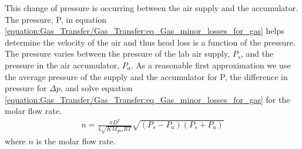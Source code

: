 \documentclass[letterpaper,10pt,english]{sphinxmanual}
\begin{document}
This change of pressure is occurring between the air supply and the accumulator. The pressure, P, in equation \eqref{equation:Gas_Transfer/Gas_Transfer:eq_Gas_minor_losses_for_gas} helps determine the velocity of the air and thus head loss is a function of the pressure. The pressure varies between the pressure of the lab air supply, \(P_s\), and the pressure in the air accumulator, \(P_a\). As a reasonable first approximation we use the average pressure of the supply and the accumulator for P, the difference in pressure for \(\Delta p\), and solve equation \eqref{equation:Gas_Transfer/Gas_Transfer:eq_Gas_minor_losses_for_gas} for the molar flow rate.
\begin{equation}\label{equation:Gas_Transfer/Gas_Transfer:eq_Gas_molar_flow_of_air}
\begin{split}\dot{n}=\frac{\pi D^{2} }{4\sqrt{KM_{gas} RT} } \sqrt{\left(P_{s} -P_{a} \right)\left(P_{s} +P_{a} \right)}\end{split}
\end{equation}
where \(\dot{n}\) is the molar flow rate.
\end{document}
